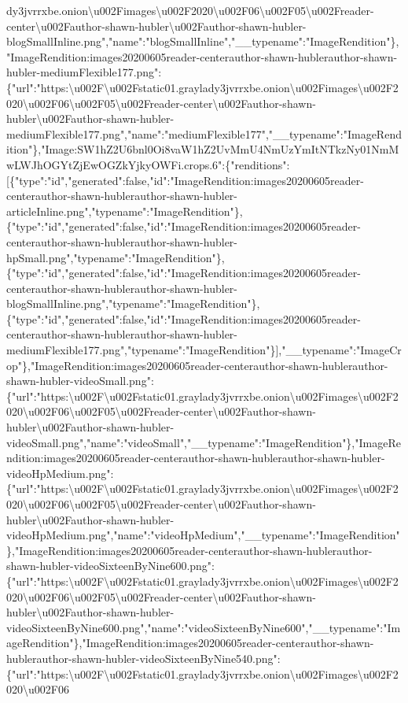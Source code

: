 dy3jvrrxbe.onion\textbackslash{}u002Fimages\textbackslash{}u002F2020\textbackslash{}u002F06\textbackslash{}u002F05\textbackslash{}u002Freader-center\textbackslash{}u002Fauthor-shawn-hubler\textbackslash{}u002Fauthor-shawn-hubler-blogSmallInline.png","name":"blogSmallInline","\_\_typename":"ImageRendition"\},"ImageRendition:images20200605reader-centerauthor-shawn-hublerauthor-shawn-hubler-mediumFlexible177.png":\{"url":"https:\textbackslash{}u002F\textbackslash{}u002Fstatic01.graylady3jvrrxbe.onion\textbackslash{}u002Fimages\textbackslash{}u002F2020\textbackslash{}u002F06\textbackslash{}u002F05\textbackslash{}u002Freader-center\textbackslash{}u002Fauthor-shawn-hubler\textbackslash{}u002Fauthor-shawn-hubler-mediumFlexible177.png","name":"mediumFlexible177","\_\_typename":"ImageRendition"\},"Image:SW1hZ2U6bnl0Oi8vaW1hZ2UvMmU4NmUzYmItNTkzNy01NmMwLWJhOGYtZjEwOGZkYjkyOWFi.crops.6":\{"renditions":{[}\{"type":"id","generated":false,"id":"ImageRendition:images20200605reader-centerauthor-shawn-hublerauthor-shawn-hubler-articleInline.png","typename":"ImageRendition"\},\{"type":"id","generated":false,"id":"ImageRendition:images20200605reader-centerauthor-shawn-hublerauthor-shawn-hubler-hpSmall.png","typename":"ImageRendition"\},\{"type":"id","generated":false,"id":"ImageRendition:images20200605reader-centerauthor-shawn-hublerauthor-shawn-hubler-blogSmallInline.png","typename":"ImageRendition"\},\{"type":"id","generated":false,"id":"ImageRendition:images20200605reader-centerauthor-shawn-hublerauthor-shawn-hubler-mediumFlexible177.png","typename":"ImageRendition"\}{]},"\_\_typename":"ImageCrop"\},"ImageRendition:images20200605reader-centerauthor-shawn-hublerauthor-shawn-hubler-videoSmall.png":\{"url":"https:\textbackslash{}u002F\textbackslash{}u002Fstatic01.graylady3jvrrxbe.onion\textbackslash{}u002Fimages\textbackslash{}u002F2020\textbackslash{}u002F06\textbackslash{}u002F05\textbackslash{}u002Freader-center\textbackslash{}u002Fauthor-shawn-hubler\textbackslash{}u002Fauthor-shawn-hubler-videoSmall.png","name":"videoSmall","\_\_typename":"ImageRendition"\},"ImageRendition:images20200605reader-centerauthor-shawn-hublerauthor-shawn-hubler-videoHpMedium.png":\{"url":"https:\textbackslash{}u002F\textbackslash{}u002Fstatic01.graylady3jvrrxbe.onion\textbackslash{}u002Fimages\textbackslash{}u002F2020\textbackslash{}u002F06\textbackslash{}u002F05\textbackslash{}u002Freader-center\textbackslash{}u002Fauthor-shawn-hubler\textbackslash{}u002Fauthor-shawn-hubler-videoHpMedium.png","name":"videoHpMedium","\_\_typename":"ImageRendition"\},"ImageRendition:images20200605reader-centerauthor-shawn-hublerauthor-shawn-hubler-videoSixteenByNine600.png":\{"url":"https:\textbackslash{}u002F\textbackslash{}u002Fstatic01.graylady3jvrrxbe.onion\textbackslash{}u002Fimages\textbackslash{}u002F2020\textbackslash{}u002F06\textbackslash{}u002F05\textbackslash{}u002Freader-center\textbackslash{}u002Fauthor-shawn-hubler\textbackslash{}u002Fauthor-shawn-hubler-videoSixteenByNine600.png","name":"videoSixteenByNine600","\_\_typename":"ImageRendition"\},"ImageRendition:images20200605reader-centerauthor-shawn-hublerauthor-shawn-hubler-videoSixteenByNine540.png":\{"url":"https:\textbackslash{}u002F\textbackslash{}u002Fstatic01.graylady3jvrrxbe.onion\textbackslash{}u002Fimages\textbackslash{}u002F2020\textbackslash{}u002F06\text